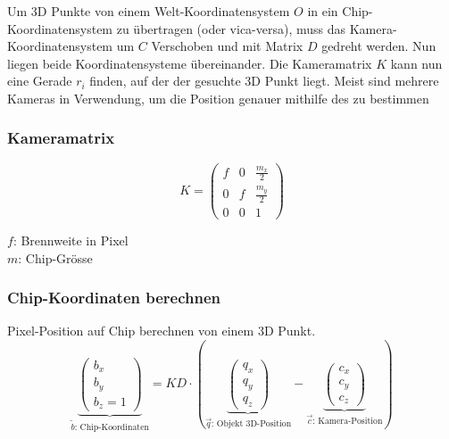 Um 3D Punkte von einem Welt-Koordinatensystem $O$ in ein Chip-Koordinatensystem zu übertragen (oder vica-versa), muss das Kamera-Koordinatensystem um $C$ Verschoben und mit Matrix $D$ gedreht werden. Nun liegen beide Koordinatensysteme übereinander. Die Kameramatrix $K$ kann nun eine Gerade $r_i$ finden, auf der der gesuchte 3D Punkt liegt. Meist sind mehrere Kameras in Verwendung, um die Position genauer mithilfe des  zu bestimmen

\subsubsection{Kameramatrix}
\begin{center}
	\begin{minipage}{0.2\textwidth}
		\[K = \begin{pmatrix}
			f & 0 & \frac{m_x}{2} \\
			0 & f & \frac{m_y}{2} \\
			0 & 0 & 1
		\end{pmatrix}\]
	\end{minipage}%
	\begin{minipage}{0.2\textwidth}
		$f$: Brennweite in Pixel \\
	    $m$: Chip-Grösse
	\end{minipage}
\end{center}

\subsubsection{Chip-Koordinaten berechnen}
Pixel-Position auf Chip berechnen von einem 3D Punkt.
\[ 
\underbrace{
	\begin{pmatrix}
		b_x \\ b_y \\ b_z = 1
	\end{pmatrix}}_{\tilde{b}\text{: Chip-Koordinaten}
}
= KD \cdot
\left(
	\underbrace{\begin{pmatrix}
		q_x \\
		q_y \\
		q_z
	\end{pmatrix}}_{\vec{q}\text{: Objekt 3D-Position}}
	-
	\underbrace{\begin{pmatrix}
		c_x \\
		c_y \\
		c_z
	\end{pmatrix}}_{\vec{c}\text{: Kamera-Position}}
\right)
\]

